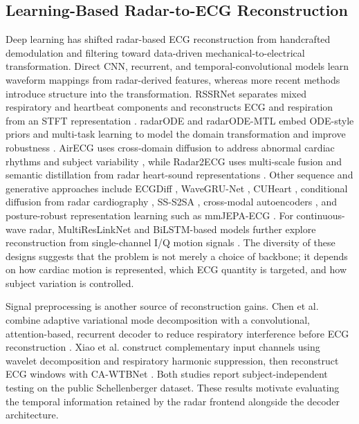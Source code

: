 \documentclass[lettersize,journal]{IEEEtran}
\begin{document}
\subsection{Learning-Based Radar-to-ECG Reconstruction}
Deep learning has shifted radar-based ECG reconstruction from handcrafted demodulation and filtering toward data-driven mechanical-to-electrical transformation. Direct CNN, recurrent, and temporal-convolutional models learn waveform mappings from radar-derived features, whereas more recent methods introduce structure into the transformation. RSSRNet separates mixed respiratory and heartbeat components and reconstructs ECG and respiration from an STFT representation \cite{rssrnet}. radarODE and radarODE-MTL embed ODE-style priors and multi-task learning to model the domain transformation and improve robustness \cite{radarode,radarodemt}. AirECG uses cross-domain diffusion to address abnormal cardiac rhythms and subject variability \cite{airecg}, while Radar2ECG uses multi-scale fusion and semantic distillation from radar heart-sound representations \cite{radar2ecg}. Other sequence and generative approaches include ECGDiff \cite{ecgdiff}, WaveGRU-Net \cite{xu2025wavegrunet}, CUHeart \cite{li2025cuheart}, conditional diffusion from radar cardiography \cite{FromRadarCardiography}, SS-S2SA \cite{S2SA}, cross-modal autoencoders \cite{cross-modalautoencoder}, and posture-robust representation learning such as mmJEPA-ECG \cite{liu2026mmjepaecg}. For continuous-wave radar, MultiResLinkNet and BiLSTM-based models further explore reconstruction from single-channel I/Q motion signals \cite{chowdhury2024multireslinknet,g2025bilstmCW}. The diversity of these designs suggests that the problem is not merely a choice of backbone; it depends on how cardiac motion is represented, which ECG quantity is targeted, and how subject variation is controlled.

Signal preprocessing is another source of reconstruction gains. Chen et al. combine adaptive variational mode decomposition with a convolutional, attention-based, recurrent decoder to reduce respiratory interference before ECG reconstruction \cite{chen2026adaptivevmd}. Xiao et al. construct complementary input channels using wavelet decomposition and respiratory harmonic suppression, then reconstruct ECG windows with CA-WTBNet \cite{xiao2026cawtbnet}. Both studies report subject-independent testing on the public Schellenberger dataset. These results motivate evaluating the temporal information retained by the radar frontend alongside the decoder architecture.
\end{document}
